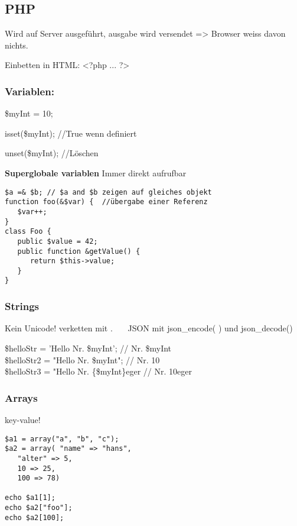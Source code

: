 \newpage
\subsection{PHP}
Wird auf Server ausgeführt, ausgabe wird versendet => Browser weiss davon nichts.

Einbetten in HTML: <?php ... ?>
\subsubsection{Variablen:}
\$myInt = 10;

isset(\$myInt); //True wenn definiert

unset(\$myInt); //Löschen

\textbf{Superglobale variablen}
Immer direkt aufrufbar 

 
\begin{verbatim}
$a =& $b; // $a and $b zeigen auf gleiches objekt
function foo(&$var) {  //übergabe einer Referenz
   $var++;
}
class Foo {
   public $value = 42;
   public function &getValue() {
      return $this->value;
   }
}
\end{verbatim}
\subsubsection{Strings}
Kein Unicode! verketten mit .~~~ JSON mit json\_encode( ) und json\_decode()

\$helloStr = 'Hello Nr. \$myInt';  // Nr. \$myInt\\
\$helloStr2 = "Hello Nr. \$myInt";  // Nr. 10\\
\$helloStr3 = "Hello Nr. \{\$myInt\}eger // Nr. 10eger \newpage
\subsubsection{Arrays}
key-value!\begin{verbatim}
$a1 = array("a", "b", "c");
$a2 = array( "name" => "hans",
   "alter" => 5,
   10 => 25,
   100 => 78)

echo $a1[1];
echo $a2["foo"];
echo $a2[100];
\end{verbatim}

